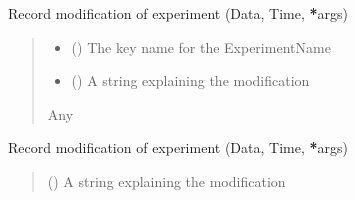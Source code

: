 \documentclass[letterpaper,10pt,english]{sphinxmanual}
\begin{document}
\begin{fulllineitems}
\begin{fulllineitems}
\label{\detokenize{Organization:Organization.Mouse.record_experiment_mod}}
\pysigstartsignatures
{}
\pysigstopsignatures
\sphinxAtStartPar
Record modification of experiment (Data, Time, {\color{red}\bfseries{}*}args)
\begin{quote}\begin{description}
\begin{itemize}
\item {} 
\sphinxAtStartPar
{} () \textendash{} The key name for the ExperimentName

\item {} 
\sphinxAtStartPar
{} () \textendash{} A string explaining the modification

\end{itemize}

\sphinxAtStartPar
Any

\end{description}\end{quote}

\end{fulllineitems}


\begin{fulllineitems}
\label{\detokenize{Organization:Organization.Mouse.record_mod}}
\pysigstartsignatures
{}
\pysigstopsignatures
\sphinxAtStartPar
Record modification of experiment (Data, Time, {\color{red}\bfseries{}*}args)
\begin{quote}\begin{description}
\sphinxAtStartPar
{} () \textendash{} A string explaining the modification


\end{description}
\end{quote}
\end{fulllineitems}
\end{fulllineitems}
\end{document}
